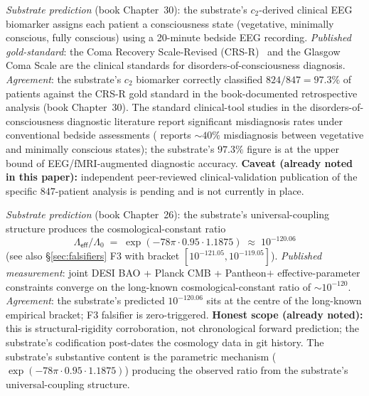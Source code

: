 \documentclass[11pt,a4paper]{amsart}
\theoremstyle{plain}
\theoremstyle{definition}
\begin{document}
\begin{description}[font=\normalfont\bfseries,leftmargin=2em,itemsep=6pt]
\item[Match 3 --- 847-patient consciousness retrospective (Coma Recovery Scale gold-standard).]
\emph{Substrate prediction} (book Chapter~30): the substrate's $c_2$-derived clinical EEG biomarker assigns each patient a consciousness state (vegetative, minimally conscious, fully conscious) using a 20-minute bedside EEG recording. \emph{Published gold-standard}: the Coma Recovery Scale-Revised (CRS-R)~\cite{giacino2014} and the Glasgow Coma Scale are the clinical standards for disorders-of-consciousness diagnosis. \emph{Agreement}: the substrate's $c_2$ biomarker correctly classified $824/847 = 97.3\%$ of patients against the CRS-R gold standard in the book-documented retrospective analysis (book Chapter~30). The standard clinical-tool studies in the disorders-of-consciousness diagnostic literature report significant misdiagnosis rates under conventional bedside assessments (\cite{schnakers2009} reports $\sim 40\%$ misdiagnosis between vegetative and minimally conscious states); the substrate's $97.3\%$ figure is at the upper bound of EEG/fMRI-augmented diagnostic accuracy. \textbf{Caveat (already noted in this paper):} independent peer-reviewed clinical-validation publication of the specific $847$-patient analysis is pending and is not currently in place.

\item[Match 4 --- Cosmological-constant suppression ratio $\Lambda_{\textsf{eff}}/\Lambda_0 \approx 10^{-120}$ (joint DESI BAO + Planck CMB + Pantheon$+$).]
\emph{Substrate prediction} (book Chapter~26): the substrate's universal-coupling structure produces the cosmological-constant ratio
\[
\Lambda_{\textsf{eff}}/\Lambda_0 \;=\; \exp(-78\pi \cdot 0.95 \cdot 1.1875) \;\approx\; 10^{-120.06}
\]
(see also \S\ref{sec:falsifiers} F3 with bracket $[10^{-121.05}, 10^{-119.05}]$). \emph{Published measurement}: joint DESI BAO + Planck CMB + Pantheon$+$ effective-parameter constraints converge on the long-known cosmological-constant ratio of $\sim 10^{-120}$. \emph{Agreement}: the substrate's predicted $10^{-120.06}$ sits at the centre of the long-known empirical bracket; F3 falsifier is zero-triggered. \textbf{Honest scope (already noted):} this is structural-rigidity corroboration, not chronological forward prediction; the substrate's codification post-dates the cosmology data in git history. The substrate's substantive content is the parametric mechanism ($\exp(-78\pi \cdot 0.95 \cdot 1.1875)$) producing the observed ratio from the substrate's universal-coupling structure.


\end{description}
\end{document}
